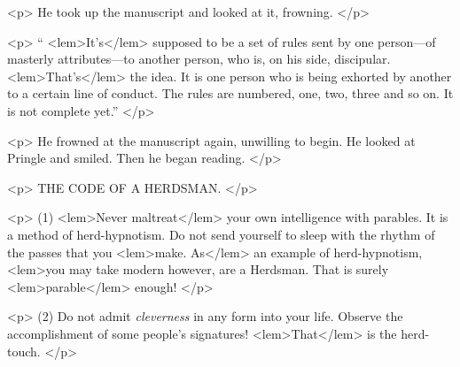 {{				<p>
				He took up the manuscript and looked at it, frowning. 
 				</p> 

				<p>
				“
<lem>It's</lem>
					{} 
				supposed to be a set of rules sent by one person---of masterly attributes---to 
				another person, who is, on his side, discipular. 
<lem>That's</lem>
					{} 
				the idea. It is one person 
				who is being exhorted by another to a certain line of conduct. The rules are numbered, 
				one, two, three and so on. It is not complete yet.” 
 				</p> 

				<p>
				He frowned at the manuscript again, unwilling to begin. He looked at Pringle and 
				smiled. Then he began reading. 
				</p> 

				<p>
				\vspace{10pt}
\noindent\large{THE CODE OF A HERDSMAN.}
				</p> 

				<p>
				\vspace{10pt}
				\noindent(1)\hspace{20pt} 
<lem>Never maltreat</lem> 
					{}
				your own intelligence with parables. It is a method of herd-hypnotism. 
				Do not send yourself to sleep with the rhythm of the passes that you 
<lem>make. As</lem> 
					{}
				an 
				example of herd-hypnotism, 
<lem>you may take modern  
					{}
				however, are a 
				Herdsman. That is surely 
<lem>parable</lem>
					{}
				enough! 
 				</p> 

				<p>
				\vspace{10pt}
				\noindent(2)\hspace{20pt} Do not admit \emph{cleverness} in any form into your life. 
				Observe the accomplishment of 
				some people's signatures! 
<lem>That</lem> 
					{}
				is the herd-touch. 
 				</p> 

}}
